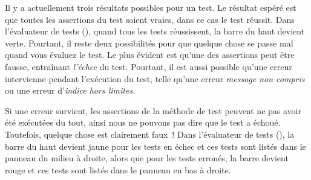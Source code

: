 \documentclass[a4paper,10pt,twoside]{book}
\begin{document}
Il y a actuellement trois résultats possibles pour un test. Le
résultat espéré est que toutes les assertions du test soient vraies,
dans ce cas le test réussit. Dans l'évaluateur de tests
(), quand tous les tests réussissent, la barre du haut
devient verte. Pourtant, il reste deux possibilités pour que quelque
chose se passe mal quand vous évaluez le test. Le plus évident est
qu'une des assertions peut être fausse, entraînant \emph{l'échec} du
test. Pourtant, il est aussi possible qu'une erreur intervienne
pendant l'exécution du test, telle qu'une erreur \emph{message non
  compris} ou une erreur 
d'\emph{indice hors limites}.

Si une erreur survient, les assertions de la méthode de test peuvent ne pas avoir été exécutées du tout, ainsi nous ne pouvons pas dire que le test a échoué. 
Toutefois, quelque chose est clairement faux~!
Dans l'évaluateur de tests (), la barre du haut devient jaune pour les tests en échec et ces tests sont listés dans le panneau du milieu à droite, alors que pour les tests erronés, la barre devient rouge et ces tests sont listés dans le panneau en bas à droite.

\end{document}
